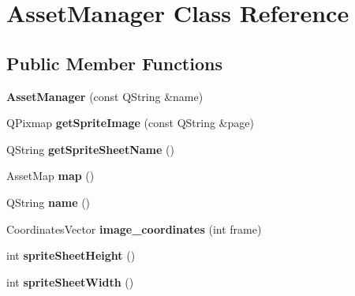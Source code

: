 \hypertarget{class_asset_manager}{}\section{Asset\+Manager Class Reference}
\label{class_asset_manager}
\subsection*{Public Member Functions}
\begin{DoxyCompactItemize}
\item 
\mbox{\label{class_asset_manager_af0306dd34eed25aba731bf54a2027193}} 
{\bfseries Asset\+Manager} (const Q\+String \&name)
\item 
\mbox{\label{class_asset_manager_abc08a58cf1fdb77b10e16128ec733c0a}} 
Q\+Pixmap {\bfseries get\+Sprite\+Image} (const Q\+String \&page)
\item 
\mbox{\label{class_asset_manager_ad40f4a2d968b74c85ba26a377496d0fa}} 
Q\+String {\bfseries get\+Sprite\+Sheet\+Name} ()
\item 
\mbox{\label{class_asset_manager_a5f5fa8d14fe3711777c83278765a20ff}} 
Asset\+Map {\bfseries map} ()
\item 
\mbox{\label{class_asset_manager_ae7b749953e6c088953213c3f32cbecee}} 
Q\+String {\bfseries name} ()
\item 
\mbox{\label{class_asset_manager_aebddd385e6cefa6f0e2f940816b57c67}} 
Coordinates\+Vector {\bfseries image\+\_\+coordinates} (int frame)
\item 
\mbox{\label{class_asset_manager_a73b932777ba2543f51304b7fda0b7d5e}} 
int {\bfseries sprite\+Sheet\+Height} ()
\item 
\mbox{\label{class_asset_manager_aa239ebd57768e3eee4422fd0fa75a405}} 
int {\bfseries sprite\+Sheet\+Width} ()
\item 
\mbox{\label{class_asset_manager_a629953081d689b6ce4ae68c86ba292cf}} 

\end{DoxyCompactItemize}
